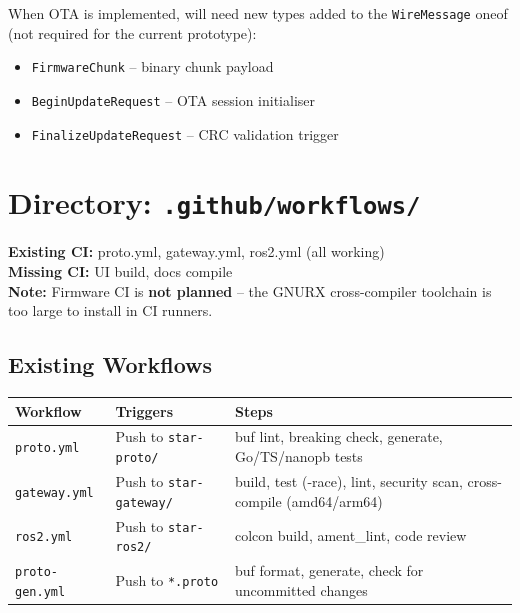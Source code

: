 \documentclass[12pt,a4paper]{article}
\newcommand{\filepath}[1]{\textcolor{dirgreen}{\texttt{\seqsplit{#1}}}}
\begin{document}
{\sloppy When OTA is implemented, \filepath{wire.proto} will need new types added
to the \texttt{WireMessage} oneof (not required for the current prototype):}

\begin{itemize}[noitemsep,topsep=4pt]
  \item \texttt{FirmwareChunk} -- binary chunk payload
  \item \texttt{BeginUpdateRequest} -- OTA session initialiser
  \item \texttt{FinalizeUpdateRequest} -- CRC validation trigger
\end{itemize}

\newpage

\section{Directory: \texttt{.github/workflows/}}

\begin{dirbox}
  \textbf{Existing CI:} proto.yml, gateway.yml, ros2.yml (all working)\\
  \textbf{Missing CI:} UI build, docs compile\\
  \textbf{Note:} Firmware CI is \textbf{not planned} -- the GNURX cross-compiler toolchain is too large to install in CI runners.
\end{dirbox}

\subsection{Existing Workflows}

\begin{center}
\small
\begin{tabular}{L{3cm}L{4cm}L{7cm}}
  \toprule
  \textbf{Workflow} & \textbf{Triggers} & \textbf{Steps} \\
  \midrule
  \texttt{proto.yml} & Push to \texttt{star-proto/} & buf lint, breaking check, generate, Go/TS/nanopb tests \\
  \texttt{gateway.yml} & Push to \texttt{star-gateway/} & build, test (-race), lint, security scan, cross-compile (amd64/arm64) \\
  \texttt{ros2.yml} & Push to \texttt{star-ros2/} & colcon build, ament\_lint, code review \\
  \texttt{proto-gen.yml} & Push to \texttt{*.proto} & buf format, generate, check for uncommitted changes \\
  \bottomrule
\end{tabular}
\end{center}
\end{document}
